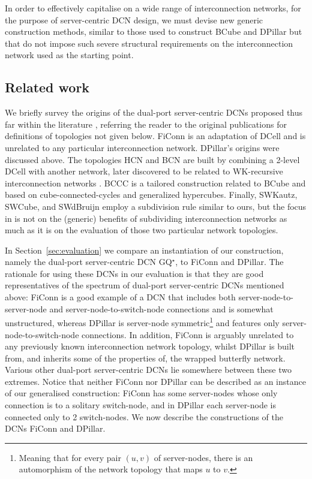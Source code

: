 \documentclass[]{amsart}
\begin{document}
In order to effectively capitalise on a wide range of interconnection networks,
for the purpose of server-centric DCN design, we must devise
new generic construction methods, similar to those used to construct BCube and DPillar but that do not
impose such severe structural requirements on the interconnection
network used as the starting point.

\subsection{Related work}
\label{sec:dual-port-networks}

We briefly survey the origins of the dual-port server-centric DCNs
proposed thus far within the literature
\cite{LiGuoWu2011,GuoChenLi2013,LiGuoYang2014,LiaoYinYin2012,LiWu2015a},
referring the reader to the original publications for definitions of
topologies not given below. FiConn
\cite{LiGuoWu2011} is an adaptation of DCell and is unrelated to any
particular interconnection network. DPillar's origins \cite{LiaoYinYin2012} were discussed
above.  The topologies HCN and BCN
\cite{GuoChenLi2013} are built by combining a 2-level DCell with
another network, later discovered to be related to WK-recursive
interconnection networks \cite{Stewart2014,Della-VecchiaSanges1988}.  BCCC \cite{LiGuoYang2014} is a tailored construction
related to BCube and based on cube-connected-cycles and generalized
hypercubes.  Finally, SWKautz, SWCube, and SWdBruijn
\cite{LiWu2015a} employ a subdivision rule similar to ours, but the
focus in \cite{LiWu2015a} is not on the (generic) benefits of subdividing
interconnection networks as much as it is on the evaluation of those
two particular network topologies.


In Section~\ref{sec:evaluation} we compare an instantiation of our construction, namely the dual-port server-centric DCN GQ$^\star$, to FiConn and
DPillar.  The rationale for using these DCNs in our evaluation is
that they are good representatives of the spectrum of dual-port server-centric DCNs mentioned above: FiConn is a good
example of a DCN that includes both server-node-to-server-node and
server-node-to-switch-node connections and is somewhat unstructured, whereas
DPillar is server-node symmetric\footnote{Meaning that for every
  pair $(u,v)$ of server-nodes, there is an automorphism of the network
  topology that maps $u$ to $v$.} \cite{EricksonKiasariNavaridas2015f} and features only server-node-to-switch-node
connections.  In addition, FiConn is arguably unrelated to any
previously known interconnection network topology,
whilst DPillar is built from, and inherits some of the properties
of, the wrapped butterfly network.  Various other dual-port server-centric
DCNs lie somewhere between these two extremes.  Notice that neither
FiConn nor DPillar can be described as an instance of our
generalised construction: FiConn has some server-nodes whose only
connection is to a solitary switch-node, and in DPillar each server-node is
connected only to 2 switch-nodes. We now describe the constructions of the
DCNs FiConn and DPillar.
\end{document}
